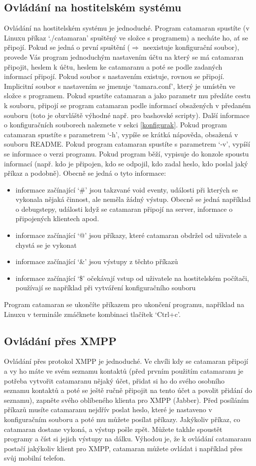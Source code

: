 \documentclass[a4paper,11pt,titlepage]{article}
\begin{document}
\subsection{Ovládání na hostitelském systému}
Ovládání na hostitelském systému je jednoduché. Program catamaran spus\-tí\-te (v Linuxu příkaz `./catamaran' spuštěný ve složce s programem) a necháte ho, ať se připojí.
Pokud se jedná o první spuštění ($\Rightarrow$ neexistuje konfigurační soubor), provede Vás program jednoduchým nastavením účtu na který se má catamaran připojit, heslem k účtu,
heslem ke catamaranu a poté se podle zadaných informací připojí. Pokud soubor s nastavením existuje, rovnou se připojí. Implicitní soubor s nastavením se jmenuje `tamara.conf', který je
umístěn ve složce s programem. Pokud spustíte catamaran a jako parametr mu předáte cestu k souboru, připojí se program catamaran podle informací obsažených v předaném souboru (toto je
obzvláště výhodné např. pro bashovské scripty). Další informace o konfiguračních souborech naleznete v sekci \ref{konfigurak}. Pokud program catamaran spustíte s parametrem `-h', vypíše
se krátká nápověda, obsažená v souboru README. Pokud program catamaran spustíte s parametrem `-v', vypíší se informace o verzi programu. Pokud program běží, vypisuje do konzole
spoustu informací (např. kdo je připojen, kdo se odpojil, kdo zadal heslo, kdo poslal jaký příkaz a podobně). Obecně se jedná o tyto informace:
\begin{itemize}
\item informace začínající `\#' jsou takzvané void eventy, události při kterých se vykonala nějaká činnost, ale neměla žádný výstup. Obecně se jedná například o
debugstepy, události když se catamaran připojí na server, informace o připojených klientech apod.
\item informace začínající `@' jsou příkazy, které catamaran obdržel od u\-ži\-va\-te\-le a chystá se je vykonat
\item informace začínající `\&' jsou výstupy z těchto příkazů
\item informace začínající `\$' očekávají vstup od uživatele na hostitelském počítači, používají se například při vytváření konfiguračního souboru
\end{itemize}
Program catamaran se ukončíte příkazem pro ukončení programu, například na Linuxu v terminále zmáčknete kombinaci tlačítek `Ctrl+c'.
\subsection{Ovládání přes XMPP}
Ovládání přes protokol XMPP je jednoduché. Ve chvíli kdy se catamaran připojí a vy ho máte ve svém seznamu kontaktů (před prvním použitím catamaranu je potřeba vytvořit catamaranu
nějaký účet, přidat si ho do svého osobního seznamu kontaktů a poté se ještě ručně připojit na tento účet a povolit přidání do seznamu), zapněte svého oblíbeného klienta pro XMPP (Jabber).
Před posíláním příkazů musíte catamaranu nejdřív poslat heslo, které je nastaveno v konfiguračním souboru a poté mu můžete posílat příkazy. Jakýkoliv příkaz, co catamaran dostane vykoná,
a výstup pošle zpět. Můžete takhle spoustět programy a číst si jejich výstupy na dálku. Výhodou je, že k ovládání catamaranu postačí jakýkoliv klient pro XMPP, catamaran můžete ovládat
i například přes svůj mobilní telefon.
\end{document}
